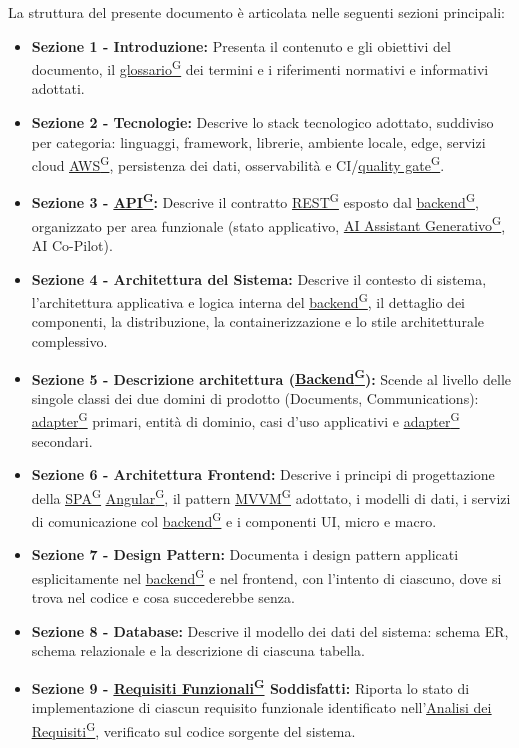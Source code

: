 \documentclass[a4paper,12pt]{article}
\providecommand{\glslink}[2]{\href{https://alittlebyte-19.github.io/Documentazione/glossario.html\#gls-#1}{\underline{#2}\textsuperscript{\scriptsize G}}}
\begin{document}
La struttura del presente documento è articolata nelle seguenti sezioni principali:
\begin{itemize}
    \item \textbf{Sezione 1 - Introduzione:} Presenta il contenuto e gli obiettivi del documento, il \glslink{glossario}{glossario} dei termini e i riferimenti normativi e informativi adottati.
    \item \textbf{Sezione 2 - Tecnologie:} Descrive lo stack tecnologico adottato, suddiviso per categoria: linguaggi, framework, librerie, ambiente locale, edge, servizi cloud \glslink{aws}{AWS}, persistenza dei dati, osservabilità e CI/\glslink{quality-gate}{quality gate}.
    \item \textbf{Sezione 3 - \glslink{api-application-programming-interface}{API}:} Descrive il contratto \glslink{rest-representational-state-transfer}{REST} esposto dal \glslink{backend}{backend}, organizzato per area funzionale (stato applicativo, \glslink{ai-assistant-generativo}{AI Assistant Generativo}, AI Co-Pilot).
    \item \textbf{Sezione 4 - Architettura del Sistema:} Descrive il contesto di sistema, l'architettura applicativa e logica interna del \glslink{backend}{backend}, il dettaglio dei componenti, la distribuzione, la containerizzazione e lo stile architetturale complessivo.
    \item \textbf{Sezione 5 - Descrizione architettura (\glslink{backend}{Backend}):} Scende al livello delle singole classi dei due domini di prodotto (Documents, Communications): \glslink{adapter}{adapter} primari, entità di dominio, casi d'uso applicativi e \glslink{adapter}{adapter} secondari.
    \item \textbf{Sezione 6 - Architettura Frontend:} Descrive i principi di progettazione della \glslink{spa-single-page-application}{SPA} \glslink{angular}{Angular}, il pattern \glslink{mvvm-model-view-viewmodel}{MVVM} adottato, i modelli di dati, i servizi di comunicazione col \glslink{backend}{backend} e i componenti UI, micro e macro.
    \item \textbf{Sezione 7 - Design Pattern:} Documenta i design pattern applicati esplicitamente nel \glslink{backend}{backend} e nel frontend, con l'intento di ciascuno, dove si trova nel codice e cosa succederebbe senza.
    \item \textbf{Sezione 8 - Database:} Descrive il modello dei dati del sistema: schema ER, schema relazionale e la descrizione di ciascuna tabella.
    \item \textbf{Sezione 9 - \glslink{requisiti-funzionali}{Requisiti Funzionali} Soddisfatti:} Riporta lo stato di implementazione di ciascun requisito funzionale identificato nell'\glslink{analisi-dei-requisiti-adr}{Analisi dei Requisiti}, verificato sul codice sorgente del sistema.
\end{itemize}
\end{document}
